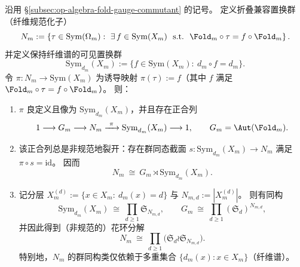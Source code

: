 \begin{theorem}\label{thm:op-algebra-fold-fiber-normalizer-wreath}
沿用 \S\ref{subsec:op-algebra-fold-gauge-commutant} 的记号。
定义折叠兼容置换群（纤维规范化子）
\[
N_m:=\left\{\tau\in\mathrm{Sym}(\Omega_m):\ \exists\, f\in\mathrm{Sym}(X_m)\ \ \text{s.t.}\ \ \Fold_m\circ\tau=f\circ\Fold_m\right\}.
\]
并定义保持纤维谱的可见置换群
\[
\mathrm{Sym}_{d_m}(X_m):=\{f\in\mathrm{Sym}(X_m):\ d_m\circ f=d_m\}.
\]
令 \(\pi:N_m\to \mathrm{Sym}(X_m)\) 为诱导映射 \(\pi(\tau):=f\)（其中 \(f\) 满足 \(\Fold_m\circ\tau=f\circ\Fold_m\)）。
则：
\begin{enumerate}
  \item \(\pi\) 良定义且像为 \(\mathrm{Sym}_{d_m}(X_m)\)，并且存在正合列
        \[
        1\longrightarrow G_m\longrightarrow N_m\xrightarrow{\ \pi\ }\mathrm{Sym}_{d_m}(X_m)\longrightarrow 1,
        \qquad
        G_m=\Aut(\Fold_m).
        \]
  \item 该正合列总是非规范地裂开：存在群同态截面 \(s:\mathrm{Sym}_{d_m}(X_m)\to N_m\) 满足 \(\pi\circ s=\mathrm{id}\)。
        因而
        \[
        N_m\ \cong\ G_m\rtimes \mathrm{Sym}_{d_m}(X_m).
        \]
  \item 记分层
        \(
        X_m^{(d)}:=\{x\in X_m:\ d_m(x)=d\}
        \)
        与
        \(N_{m,d}:=|X_m^{(d)}|\)。
        则有同构
        \[
        \mathrm{Sym}_{d_m}(X_m)\ \cong\ \prod_{d\ge 1}\mathfrak S_{N_{m,d}},
        \qquad
        G_m\ \cong\ \prod_{d\ge 1}(\mathfrak S_d)^{N_{m,d}},
        \]
        并因此得到（非规范的）花环分解
        \[
        N_m\ \cong\ \prod_{d\ge 1}\bigl(\mathfrak S_d\wr \mathfrak S_{N_{m,d}}\bigr).
        \]
        特别地，\(N_m\) 的群同构类仅依赖于多重集合 \(\{d_m(x):x\in X_m\}\)（纤维谱）。
\end{enumerate}
\end{theorem}
